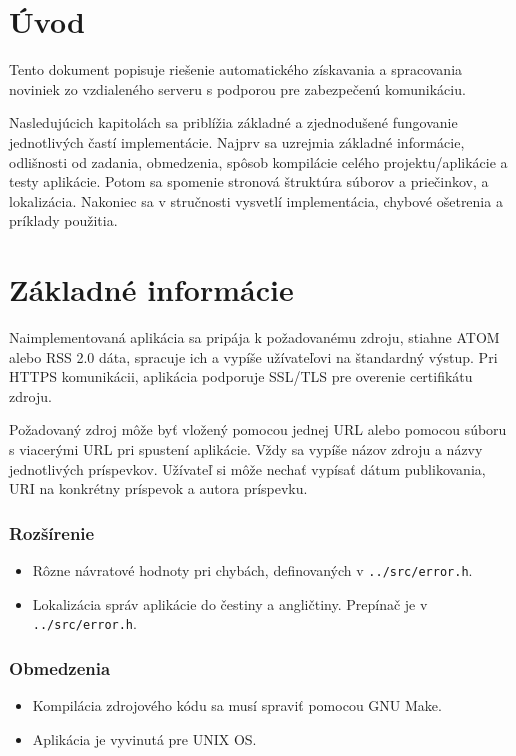 \chapter{Úvod}
Tento dokument popisuje riešenie automatického získavania a spracovania noviniek zo vzdialeného serveru s podporou pre zabezpečenú komunikáciu. 

Nasledujúcich kapitolách sa priblížia základné a zjednodušené fungovanie jednotlivých častí implementácie. Najprv sa uzrejmia základné informácie, odlišnosti od zadania, obmedzenia, spôsob kompilácie celého projektu/aplikácie a testy aplikácie. Potom sa spomenie stronová štruktúra súborov a priečinkov, a lokalizácia. Nakoniec sa v stručnosti vysvetlí implementácia, chybové ošetrenia a príklady použitia.

\chapter{Základné informácie}
\label{basic_info}
Naimplementovaná aplikácia sa pripája k požadovanému zdroju, stiahne ATOM alebo RSS 2.0 dáta, spracuje ich a vypíše užívateľovi na štandardný výstup. Pri HTTPS komunikácii, aplikácia podporuje SSL/TLS pre overenie certifikátu zdroju.

Požadovaný zdroj môže byť vložený pomocou jednej URL alebo pomocou súboru s viacerými URL pri spustení aplikácie.
Vždy sa vypíše názov zdroju a názvy jednotlivých príspevkov.
Užívateľ si môže nechať vypísať dátum publikovania, URI na konkrétny príspevok a autora príspevku.

\subsection*{Rozšírenie}
\begin{itemize}
  \item{Rôzne návratové hodnoty pri chybách, definovaných v {\tt../src/error.h}.}
  \item{Lokalizácia správ aplikácie do čestiny a angličtiny. Prepínač je v {\tt../src/error.h}.}
\end{itemize}

\subsection*{Obmedzenia}
\begin{itemize}
  \item{Kompilácia zdrojového kódu sa musí spraviť pomocou GNU Make.}
  \item{Aplikácia je vyvinutá pre UNIX OS.}
\end{itemize}


